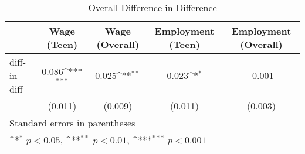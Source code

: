 \begin{table}[htbp]\centering
\def\sym#1{\ifmmode^{#1}\else\(^{#1}\)\fi}
\caption{Overall Difference in Difference\label{auto}}
\begin{tabular}{l*{4}{c}}
\hline\hline
            & Wage (Teen)         &Wage (Overall)         &Employment (Teen)         &Employment (Overall)         \\
\hline
diff-in-diff&       0.086\sym{***}&       0.025\sym{**} &       0.023\sym{*}  &      -0.001         \\
            &     (0.011)         &     (0.009)         &     (0.011)         &     (0.003)         \\
\hline\hline
\multicolumn{5}{l}{\footnotesize Standard errors in parentheses}\\
\multicolumn{5}{l}{\footnotesize \sym{*} \(p<0.05\), \sym{**} \(p<0.01\), \sym{***} \(p<0.001\)}\\
\end{tabular}
\end{table}
